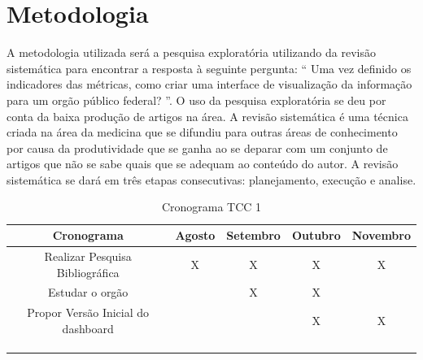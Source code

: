 \chapter[Metodologia]{Metodologia}

A metodologia utilizada será a pesquisa exploratória utilizando da revisão sistemática para encontrar a resposta à seguinte pergunta: “ Uma vez definido os indicadores das métricas, como criar uma interface de visualização da informação para um orgão público federal? ”. O uso da pesquisa exploratória se deu por conta da baixa produção de artigos na área. A revisão sistemática é uma técnica criada na área da medicina que se difundiu para outras áreas de conhecimento por causa da produtividade que se ganha ao se deparar com um conjunto de artigos que não se sabe quais que se adequam ao conteúdo do autor. A revisão sistemática se dará em três etapas consecutivas: planejamento, execução e analise.


\begin{table}[http]
	\centering
	\caption{Cronograma TCC 1}
	\label{tab:cronograma}
	\begin{tabular}{ccccc}
		\hline
		\multicolumn{1}{|c|}{\textbf{Cronograma}}             & \multicolumn{1}{c|}{\textbf{Agosto}} & \multicolumn{1}{c|}{\textbf{Setembro}} & \multicolumn{1}{c|}{\textbf{Outubro}} & \multicolumn{1}{c|}{\textbf{Novembro}} \\ \hline
		\multicolumn{1}{|c|}{Realizar Pesquisa Bibliográfica} & \multicolumn{1}{c|}{X}              & \multicolumn{1}{c|}{X}              & \multicolumn{1}{c|}{X}             & \multicolumn{1}{c|}{X}              \\ \hline
		\multicolumn{1}{|c|}{Estudar o orgão}             & \multicolumn{1}{c|}{}               & \multicolumn{1}{c|}{X}              & \multicolumn{1}{c|}{X}             & \multicolumn{1}{c|}{}               \\ \hline
		\multicolumn{1}{|c|}{Propor Versão Inicial do dashboard}                & \multicolumn{1}{c|}{}               & \multicolumn{1}{c|}{}               & \multicolumn{1}{c|}{X}             & \multicolumn{1}{c|}{X}              \\ \hline
		\multicolumn{1}{l}{}                                  & \multicolumn{1}{l}{}                & \multicolumn{1}{l}{}                & \multicolumn{1}{l}{}               & \multicolumn{1}{l}{}                \\
		\multicolumn{1}{l}{}                                  & \multicolumn{1}{l}{}                & \multicolumn{1}{l}{}                & \multicolumn{1}{l}{}               & \multicolumn{1}{l}{}                \\
		\multicolumn{1}{l}{}                                  & \multicolumn{1}{l}{}                & \multicolumn{1}{l}{}                & \multicolumn{1}{l}{}               & \multicolumn{1}{l}{}               
	\end{tabular}
\end{table}



